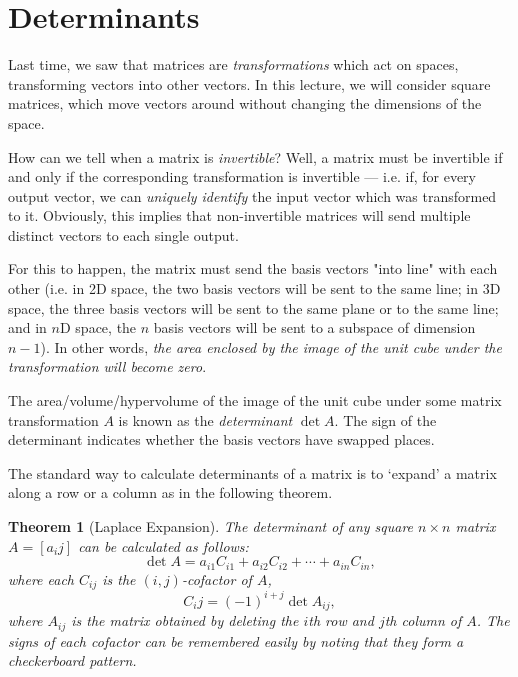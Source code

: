 \documentclass[10pt, a4paper]{amsart}
\newtheorem{thm}{Theorem}
\theoremstyle{definition}
\theoremstyle{remark}
\begin{document}
\section{Determinants}
Last time, we saw that matrices are \emph{transformations} which act on spaces, transforming
vectors into other vectors. In this lecture, we will consider square matrices, which move
vectors around without changing the dimensions of the space.

How can we tell when a matrix is \emph{invertible}? Well, a matrix must be invertible if and
only if the corresponding transformation is invertible --- i.e. if, for every output vector, we can
\emph{uniquely identify} the input vector which was transformed to it. Obviously, this implies
that non-invertible matrices will send multiple distinct vectors to each single output.

For this to happen, the matrix must send the basis vectors "into line" with each other (i.e. in 2D space, the
two basis vectors will be sent to the same line; in 3D space, the three basis vectors will be sent to the same
plane or to the same line; and in $n$D space, the $ n $ basis vectors will be sent to a subspace of dimension
$ n - 1 $). In other words, \emph{the area enclosed by the image of the unit cube under the transformation will
become zero}.

The area/volume/hypervolume of the image of the unit cube under some matrix transformation $ A $ is known
as the \emph{determinant} $ \det A $. The sign of the determinant indicates whether the basis vectors have
swapped places.

The standard way to calculate determinants of a matrix is to `expand' a matrix along a row
or a column as in the following theorem.

\begin{thm}[Laplace Expansion]
  The determinant of any square $ n \times n $ matrix $ A = [a_ij] $ can be calculated as follows:
  \begin{displaymath}
    \det A = a_{i1} C_{i1} + a_{i2} C_{i2} + \cdots + a_{in} C_{in},
  \end{displaymath}
  where each $ C_{ij} $ is the $ (i,j)$-cofactor of $ A $,
  \begin{displaymath}
    C_ij = (-1)^{i+j} \det A_{ij},
  \end{displaymath}
  where $ A_{ij} $ is the matrix obtained by deleting the $ i$th row and $ j$th column of $ A $.
  The signs of each cofactor can be remembered easily by noting that they form a checkerboard pattern.
\end{thm}
\end{document}
